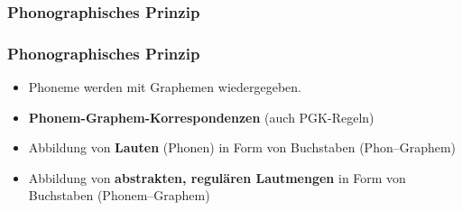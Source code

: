 \subsubsection{Phonographisches Prinzip}


\begin{frame}
\frametitle{Phonographisches Prinzip}

\begin{itemize}
	\item Phoneme werden mit Graphemen wiedergegeben.
	\item \textbf{Phonem-Graphem-Korrespondenzen} (auch PGK-Regeln)

\pause	

	\item Abbildung von \textbf{Lauten} (Phonen) in Form von Buchstaben (Phon--Graphem)\\ 
	\vs
	\item Abbildung von \textbf{abstrakten, regulären Lautmengen} in
Form von Buchstaben (Phonem--Graphem)

\end{itemize}

\end{frame}


